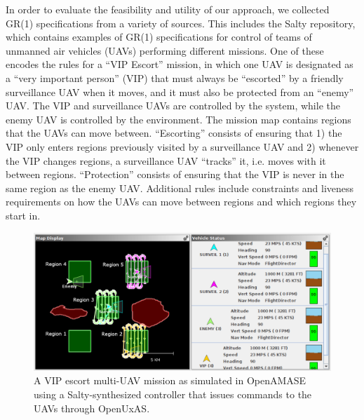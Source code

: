 \documentclass[runningheads]{llncs}
\begin{document}
In order to evaluate the feasibility and utility of our approach, we collected GR(1) specifications from a variety of sources. 
This includes the Salty repository, which contains examples of GR(1) specifications 
for control of teams of unmanned air vehicles (UAVs) performing different missions. 
One of these encodes the rules for a ``VIP Escort'' mission, 
in which one UAV is designated as a ``very important person'' (VIP) 
that must always be ``escorted'' by a friendly surveillance UAV when it moves, 
and it must also be protected from an ``enemy'' UAV. 
The VIP and surveillance UAVs are controlled by the system, while the enemy UAV is controlled by the environment.
The mission map contains regions that the UAVs can move between.  
``Escorting'' consists of ensuring that 1) the VIP only enters regions previously visited by a surveillance UAV 
and 2) whenever the VIP changes regions, a surveillance UAV ``tracks'' it, i.e. moves with it between regions. 
``Protection'' consists of ensuring that the VIP is never in the same region as the enemy UAV. 
Additional rules include constraints and liveness requirements on how the UAVs can move between regions and which regions they start in. 

\begin{figure}
  \includegraphics[width=\textwidth]{smallMission}
  \caption{A VIP escort multi-UAV mission as simulated in OpenAMASE using a Salty-synthesized controller that issues commands to the UAVs through OpenUxAS.}
  \label{fig:vipEscort}
\end{figure}
\end{document}
